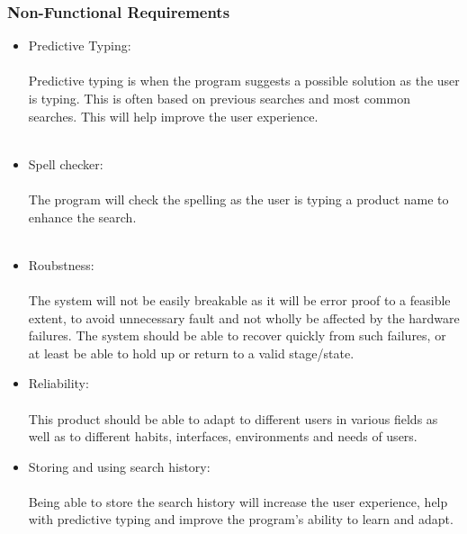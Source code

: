 \documentclass[a4paper,10pt]{article}
\begin{document}
	\subsubsection{Non-Functional Requirements}
		\begin{itemize}
		\item Predictive Typing:\\\\
			Predictive typing is when the program suggests a possible solution as the user is typing. This is often based on previous searches and most common searches. This will help improve the user experience. \\\\
		
		\item Spell checker:\\\\
			The program will check the spelling as the user is typing a product name to enhance the search. \\\\
	
		\item Roubstness:\\\\
			The system will not be easily breakable as it will be error proof to a feasible extent, to avoid unnecessary fault and not wholly be affected by the hardware failures. The system should be able to recover quickly from such failures, or at least be able to hold up or return to a valid stage/state.
			
			
		\item Reliability:\\\\
			This product should be able to adapt to different users in various fields as well as to different habits, interfaces, environments and needs of users.  
	
		\item Storing and using search history:\\\\
			Being able to store the search history will increase the user experience, help with predictive typing and improve the program's ability to learn and adapt.\\\\
		\end{itemize}

	
\end{document}
